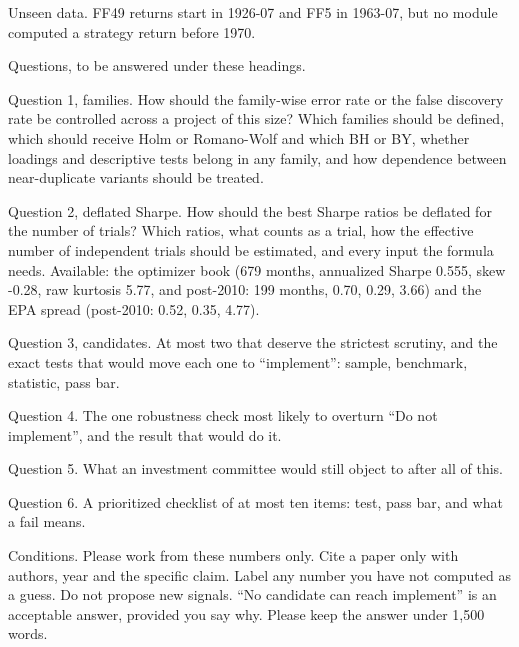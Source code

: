 \medskip
\par\noindent Unseen data. FF49 returns start in 1926-07 and FF5 in 1963-07, but no module computed a strategy return before 1970.
\medskip
\par\noindent Questions, to be answered under these headings.
\par\noindent Question 1, families. How should the family-wise error rate or the false discovery rate be controlled across a project of this size? Which families should be defined, which should receive Holm or Romano-Wolf and which BH or BY, whether loadings and descriptive tests belong in any family, and how dependence between near-duplicate variants should be treated.
\par\noindent Question 2, deflated Sharpe. How should the best Sharpe ratios be deflated for the number of trials? Which ratios, what counts as a trial, how the effective number of independent trials should be estimated, and every input the formula needs. Available: the optimizer book (679 months, annualized Sharpe 0.555, skew -0.28, raw kurtosis 5.77, and post-2010: 199 months, 0.70, 0.29, 3.66) and the EPA spread (post-2010: 0.52, 0.35, 4.77).
\par\noindent Question 3, candidates. At most two that deserve the strictest scrutiny, and the exact tests that would move each one to ``implement'': sample, benchmark, statistic, pass bar.
\par\noindent Question 4. The one robustness check most likely to overturn ``Do not implement'', and the result that would do it.
\par\noindent Question 5. What an investment committee would still object to after all of this.
\par\noindent Question 6. A prioritized checklist of at most ten items: test, pass bar, and what a fail means.
\medskip
\par\noindent Conditions. Please work from these numbers only. Cite a paper only with authors, year and the specific claim. Label any number you have not computed as a guess. Do not propose new signals. ``No candidate can reach implement'' is an acceptable answer, provided you say why. Please keep the answer under 1,500 words.
